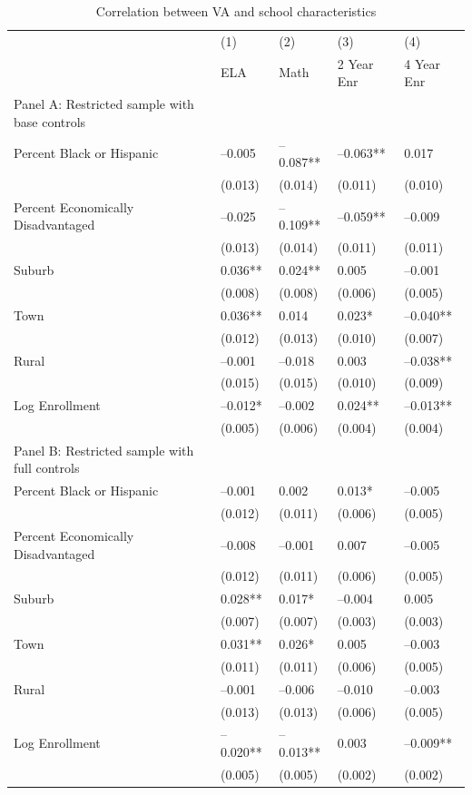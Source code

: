 \documentclass{article}
\begin{document}
\begin{table}[tbp] \centering
{}

\caption{Correlation between VA and school characteristics}
{\footnotesize
\begin{tabularx}{\linewidth}{lCCCC}

\toprule
&{(1)}&{(2)}&{(3)}&{(4)} \tabularnewline
{} & ELA & Math & 2 Year Enr & 4 Year Enr \tabularnewline
\midrule \addlinespace[\belowrulesep]
Panel A: Restricted sample with base controls&&&& \tabularnewline
\midrule Percent Black or Hispanic&--0.005&--0.087**&--0.063**&0.017 \tabularnewline
&(0.013)&(0.014)&(0.011)&(0.010) \tabularnewline
\midrule Percent Economically Disadvantaged&--0.025&--0.109**&--0.059**&--0.009 \tabularnewline
&(0.013)&(0.014)&(0.011)&(0.011) \tabularnewline
\midrule Suburb&0.036**&0.024**&0.005&--0.001 \tabularnewline
&(0.008)&(0.008)&(0.006)&(0.005) \tabularnewline
Town&0.036**&0.014&0.023*&--0.040** \tabularnewline
&(0.012)&(0.013)&(0.010)&(0.007) \tabularnewline
Rural&--0.001&--0.018&0.003&--0.038** \tabularnewline
&(0.015)&(0.015)&(0.010)&(0.009) \tabularnewline
\midrule Log Enrollment&--0.012*&--0.002&0.024**&--0.013** \tabularnewline
&(0.005)&(0.006)&(0.004)&(0.004) \tabularnewline
\midrule \midrule Panel B: Restricted sample with full controls&&&& \tabularnewline
\midrule Percent Black or Hispanic&--0.001&0.002&0.013*&--0.005 \tabularnewline
&(0.012)&(0.011)&(0.006)&(0.005) \tabularnewline
\midrule Percent Economically Disadvantaged&--0.008&--0.001&0.007&--0.005 \tabularnewline
&(0.012)&(0.011)&(0.006)&(0.005) \tabularnewline
\midrule Suburb&0.028**&0.017*&--0.004&0.005 \tabularnewline
&(0.007)&(0.007)&(0.003)&(0.003) \tabularnewline
Town&0.031**&0.026*&0.005&--0.003 \tabularnewline
&(0.011)&(0.011)&(0.006)&(0.005) \tabularnewline
Rural&--0.001&--0.006&--0.010&--0.003 \tabularnewline
&(0.013)&(0.013)&(0.006)&(0.005) \tabularnewline
\midrule Log Enrollment&--0.020**&--0.013**&0.003&--0.009** \tabularnewline
&(0.005)&(0.005)&(0.002)&(0.002) \tabularnewline
\bottomrule 

\end{tabularx}
}
\end{table}
\end{document}
